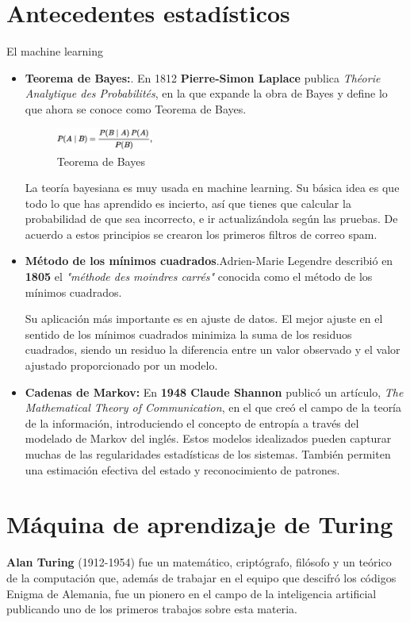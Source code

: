 \documentclass[a4paper, 11pt]{article} %
\begin{document}
\section{Antecedentes estadísticos}
El machine learning 
\begin{itemize}
	\item \textbf{Teorema de Bayes:}. En 1812 \textbf{Pierre-Simon Laplace} publica \emph{Théorie Analytique des Probabilités}, en la que expande la obra de Bayes y define lo que ahora se conoce como Teorema de Bayes.
	
	\begin{figure}[H]
		\centering
		\includegraphics[width=0.3\textwidth]{bayes.png}
		\caption{Teorema de Bayes}
		\label{Teorema de Bayes}
	\end{figure}

	La teoría bayesiana es muy usada en machine learning. Su básica idea es que todo lo que has aprendido es incierto, así que tienes que calcular la probabilidad de que sea incorrecto, e ir actualizándola según las pruebas. De acuerdo a estos principios se crearon los primeros filtros de correo spam.
	
	\item \textbf{Método de los mínimos cuadrados}.Adrien-Marie Legendre describió en \textbf{1805} el \emph{"méthode des moindres carrés"} conocida como el método de los mínimos cuadrados.
	
	Su aplicación más importante es en ajuste de datos. El mejor ajuste en el sentido de los mínimos cuadrados minimiza la suma de los residuos cuadrados, siendo un residuo la diferencia entre un valor observado y el valor ajustado proporcionado por un modelo.
	\item \textbf{Cadenas de Markov:} En \textbf{1948 Claude Shannon} publicó un artículo, \emph{The Mathematical Theory of Communication}, en el que creó el campo de la teoría de la información, introduciendo el concepto de entropía a través del modelado de Markov del inglés. Estos modelos idealizados pueden capturar muchas de las regularidades estadísticas de los sistemas. También permiten una estimación efectiva del estado y reconocimiento de patrones.
	
\end{itemize}
\section{Máquina de aprendizaje de Turing}
\textbf{Alan Turing} (1912-1954) fue un matemático, criptógrafo, filósofo y un teórico de la computación que, además de trabajar en el equipo que descifró los códigos Enigma de Alemania, fue un pionero en el campo de la inteligencia artificial publicando uno de los primeros trabajos sobre esta materia.
\end{document}
